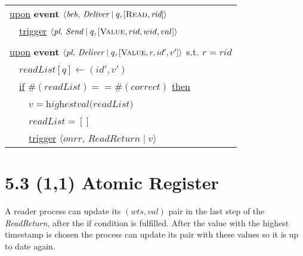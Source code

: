 \documentclass{article}
\begin{document}
\begin{adjustwidth}{2em}{2em}
\begin{center}
\begin{tabular}{l}
				\\
				\underline{upon} \textbf{event} $\langle \textit{beb, Deliver} \mid q, [\textsc{Read}, \textit{rid}] \rangle$ \\
				\ \ \underline{trigger} $\langle \textit{pl, Send} \mid q, [\textsc{Value}, rid, wid, val] \rangle$ \\
				\\
				\underline{upon} \textbf{event} $\langle \textit{pl, Deliver} \mid q, [\textsc{Value}, r, id', v'] \rangle$ s.t. $r = rid$\\
				\ \ $readList[q] \leftarrow (id', v')$ \\
				\ \ \underline{if} $\#(readList) == \#(correct)$ \underline{then} \\
				\ \ \ \ $v = \textit{highestval(readList)}$ \\
				\ \ \ \ $readList = []$ \\
				\ \ \ \ \underline{trigger} $\langle \textit{onrr, ReadReturn} \mid v \rangle$
				
			\end{tabular}
		\end{center}
	\end{adjustwidth}
	
	\section*{5.3 (1,1) Atomic Register}
	\begin{adjustwidth}{2em}{2em}
		A reader process can update its $(wts, val)$ pair in the last step of the \textit{ReadReturn}, after the if condition is fulfilled. After the value with the highest timestamp is chosen the process can update its pair with these values so it is up to date again.
	\end{adjustwidth}
\end{document}
